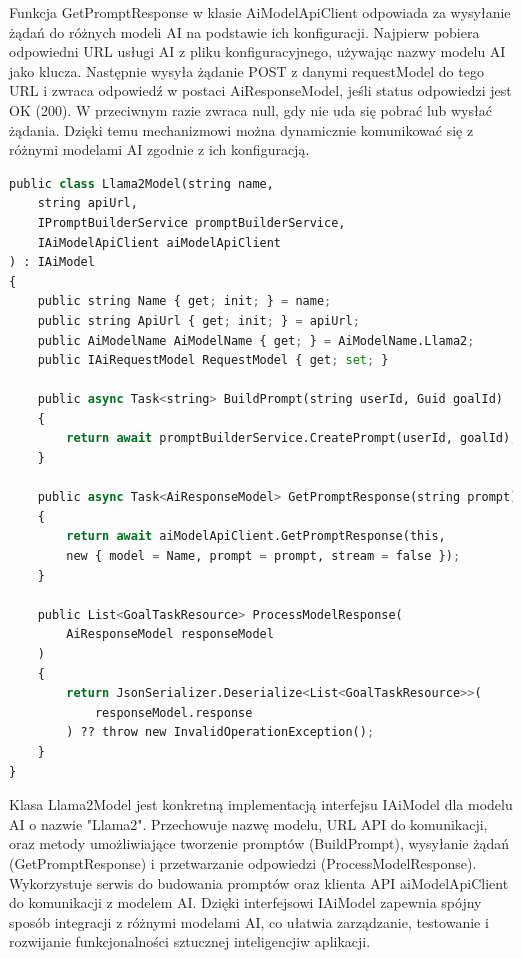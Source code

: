 Funkcja GetPromptResponse w klasie AiModelApiClient odpowiada za wysyłanie żądań do różnych modeli AI na podstawie ich konfiguracji. Najpierw pobiera odpowiedni URL usługi AI z pliku konfiguracyjnego, używając nazwy modelu AI jako klucza. Następnie wysyła żądanie POST z danymi requestModel do tego URL i zwraca odpowiedź w postaci AiResponseModel, jeśli status odpowiedzi jest OK (200). W przeciwnym razie zwraca null, gdy nie uda się pobrać lub wysłać żądania. Dzięki temu mechanizmowi można dynamicznie komunikować się z różnymi modelami AI zgodnie z ich konfiguracją.

\begin{lstlisting}[language=Python, caption=Implementacja interfejsu IAiModel na podstawie modelu Llama2, linewidth=160mm]
public class Llama2Model(string name,
    string apiUrl, 
    IPromptBuilderService promptBuilderService, 
    IAiModelApiClient aiModelApiClient
) : IAiModel
{
    public string Name { get; init; } = name;
    public string ApiUrl { get; init; } = apiUrl;
    public AiModelName AiModelName { get; } = AiModelName.Llama2;
    public IAiRequestModel RequestModel { get; set; }

    public async Task<string> BuildPrompt(string userId, Guid goalId)
    {
        return await promptBuilderService.CreatePrompt(userId, goalId);
    }

    public async Task<AiResponseModel> GetPromptResponse(string prompt)
    {
        return await aiModelApiClient.GetPromptResponse(this, 
        new { model = Name, prompt = prompt, stream = false });
    }

    public List<GoalTaskResource> ProcessModelResponse(
        AiResponseModel responseModel
    )
    {
        return JsonSerializer.Deserialize<List<GoalTaskResource>>(
            responseModel.response
        ) ?? throw new InvalidOperationException();
    }
}
\end{lstlisting}
Klasa Llama2Model jest konkretną implementacją interfejsu IAiModel dla modelu AI o nazwie "Llama2". Przechowuje nazwę modelu, URL API do komunikacji, oraz metody umożliwiające tworzenie promptów (BuildPrompt), wysyłanie żądań (GetPromptResponse) i przetwarzanie odpowiedzi (ProcessModelResponse). Wykorzystuje serwis do budowania promptów oraz klienta API aiModelApiClient do komunikacji z modelem AI. Dzięki interfejsowi IAiModel zapewnia spójny sposób integracji z różnymi modelami AI, co ułatwia zarządzanie, testowanie i rozwijanie funkcjonalności sztucznej inteligencji\linebreak w aplikacji.

